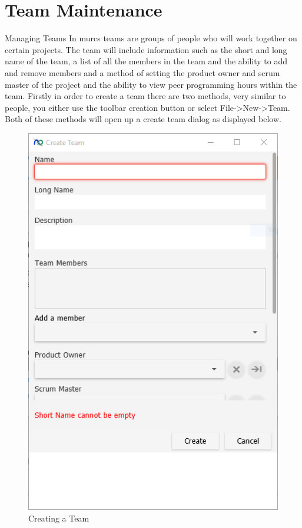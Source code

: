 \section{Team Maintenance}

Managing Teams
\newline\newline
In murcs teams are groups of people who will work together on certain projects. The team will include information such as the short and long name of the team, a list of all the members in the team and the ability to add and remove members and a method of setting the product owner and scrum master of the project and the ability to view peer programming hours within the team.
\newline
Firstly in order to create a team there are two methods, very similar to people, you either use the toolbar creation button or select File->New->Team. Both of these methods will open up a create team dialog as displayed below.

\begin{figure}[H]
\centering
\includegraphics[width=\textwidth]{images/screenshots/teams1.PNG}
\caption{Creating a Team}
\label{fig:new_project}
\end{figure}

